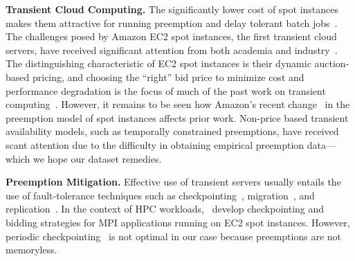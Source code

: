 \noindent \textbf{Transient Cloud Computing.}
The significantly lower cost of spot instances makes them attractive for running preemption and delay tolerant batch jobs~\cite{spoton, jain14demand, yi2010reducing, conductor, liu-spot, spot-run, dubois2016optispot, varshney_autobot_2019, harlap2018tributary}. 
The challenges posed by Amazon EC2 spot instances, the first transient cloud servers, have received significant attention from both academia  and industry~\cite{spotinst}. 
The distinguishing characteristic of EC2 spot instances is their dynamic auction-based pricing, and choosing the ``right'' bid price to minimize cost and performance degradation is the focus of much of the past work on transient computing~\cite{bidding4,mihailescu2012impact,bidding7,bidding1,bidding8,bidding3,bidding6,bid-cloud,bidding5,wolski_probabilistic_2017, guo_bidding_2015}.
However, it remains to be seen how Amazon's recent change~\cite{bid-change, irwin-icccn19, baughman2019deconstructing, pham2018performance} in the preemption model of spot instances affects prior work. 
Non-price based transient availability models, such as temporally constrained preemptions, have received scant attention due to the difficulty in obtaining empirical preemption data---which we hope our dataset remedies. 
%

%
%

\noindent \textbf{Preemption Mitigation.}
Effective use of transient servers usually entails the use of fault-tolerance techniques such as checkpointing~\cite{flint}, migration~\cite{spotcheck}, and replication~\cite{spoton}. 
In the context of HPC workloads,~\cite{marathe2014exploiting,gong_monetary_2015,xiang_spotmpi:_2011} develop checkpointing and bidding strategies for MPI applications running on EC2 spot instances.
However, periodic checkpointing~\cite{dongarra_fault_nodate, bougeret_checkpointing_2011} is not optimal in our case because preemptions are not memoryless. 

